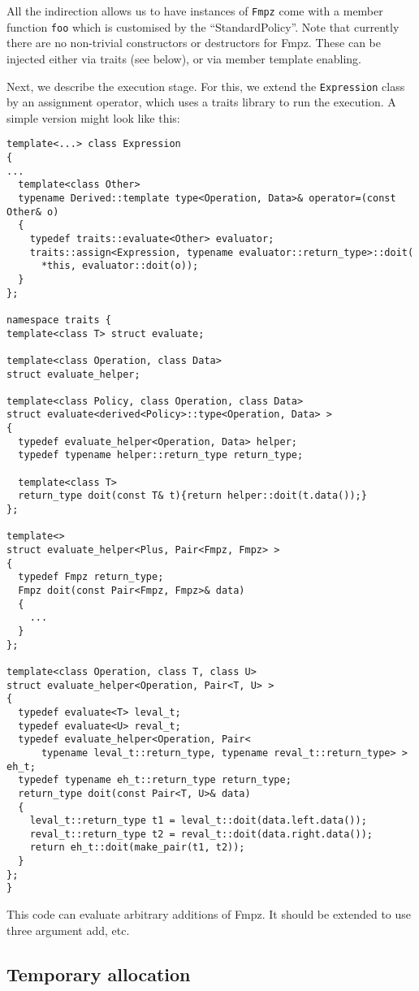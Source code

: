 \documentclass{scrartcl}
\begin{document}
All the indirection allows us to have instances of \texttt{Fmpz} come with a member
function \texttt{foo} which is customised by the ``StandardPolicy''. Note
that currently there are no non-trivial constructors or destructors for
Fmpz. These can be injected either via traits (see below), or via member
template enabling.

Next, we describe the execution stage. For this, we extend the
\texttt{Expression} class by an assignment operator, which uses a traits
library to run the execution. A simple version might look like this:

\begin{verbatim}
template<...> class Expression
{
...
  template<class Other>
  typename Derived::template type<Operation, Data>& operator=(const Other& o)
  {
    typedef traits::evaluate<Other> evaluator;
    traits::assign<Expression, typename evaluator::return_type>::doit(
      *this, evaluator::doit(o));
  }
};

namespace traits {
template<class T> struct evaluate;

template<class Operation, class Data>
struct evaluate_helper;

template<class Policy, class Operation, class Data>
struct evaluate<derived<Policy>::type<Operation, Data> >
{
  typedef evaluate_helper<Operation, Data> helper;
  typedef typename helper::return_type return_type;

  template<class T>
  return_type doit(const T& t){return helper::doit(t.data());}
};

template<>
struct evaluate_helper<Plus, Pair<Fmpz, Fmpz> >
{
  typedef Fmpz return_type;
  Fmpz doit(const Pair<Fmpz, Fmpz>& data)
  {
    ...
  }
};

template<class Operation, class T, class U>
struct evaluate_helper<Operation, Pair<T, U> >
{
  typedef evaluate<T> leval_t;
  typedef evaluate<U> reval_t;
  typedef evaluate_helper<Operation, Pair<
      typename leval_t::return_type, typename reval_t::return_type> > eh_t;
  typedef typename eh_t::return_type return_type;
  return_type doit(const Pair<T, U>& data)
  {
    leval_t::return_type t1 = leval_t::doit(data.left.data());
    reval_t::return_type t2 = reval_t::doit(data.right.data());
    return eh_t::doit(make_pair(t1, t2));
  }
};
}
\end{verbatim}

This code can evaluate arbitrary additions of Fmpz. It should be extended
to use three argument add, etc.

\subsection*{Temporary allocation}
\end{document}
